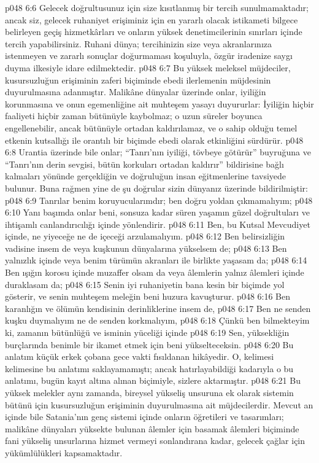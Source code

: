 \vs p048 6:6 Gelecek doğrultusunuz için size kısıtlanmış bir tercih sunulmamaktadır; ancak siz, gelecek ruhaniyet erişiminiz için en yararlı olacak istikameti bilgece belirleyen geçiş hizmetkârları ve onların yüksek denetimcilerinin sınırları içinde tercih yapabilirsiniz. Ruhani dünya; tercihinizin size veya akranlarınıza istenmeyen ve zararlı sonuçlar doğurmaması koşuluyla, özgür iradenize saygı duyma ilkesiyle idare edilmektedir.
\vs p048 6:7 Bu yüksek meleksel müjdeciler, kusursuzluğun erişiminin zaferi biçiminde ebedi ilerlemenin müjdesinin duyurulmasına adanmıştır. Malikâne dünyalar üzerinde onlar, iyiliğin korunmasına ve onun egemenliğine ait muhteşem yasayı duyururlar: İyiliğin hiçbir faaliyeti hiçbir zaman bütünüyle kaybolmaz; o uzun süreler boyunca engellenebilir, ancak bütünüyle ortadan kaldırılamaz, ve o sahip olduğu temel etkenin kutsallığı ile orantılı bir biçimde ebedi olarak etkinliğini sürdürür.
\vs p048 6:8 Urantia üzerinde bile onlar; “Tanrı’nın iyiliği, tövbeye götürür” buyruğuna ve “Tanrı’nın derin sevgisi, bütün korkuları ortadan kaldırır” bildirisine bağlı kalmaları yönünde gerçekliğin ve doğruluğun insan eğitmenlerine tavsiyede bulunur. Buna rağmen yine de şu doğrular sizin dünyanız üzerinde bildirilmiştir:
\vs p048 6:9 Tanrılar benim koruyucularımdır; ben doğru yoldan çıkmamalıyım;
\vs p048 6:10 Yanı başımda onlar beni, sonsuza kadar süren yaşamın güzel doğrultuları ve ihtişamlı canlandırıcılığı içinde yönlendirir.
\vs p048 6:11 Ben, bu Kutsal Mevcudiyet içinde, ne yiyeceğe ne de içeceği arzulamalıyım.
\vs p048 6:12 Ben belirsizliğin vadisine insem de veya kuşkunun dünyalarına yükselsem de;
\vs p048 6:13 Ben yalnızlık içinde veya benim türümün akranları ile birlikte yaşasam da;
\vs p048 6:14 Ben ışığın korosu içinde muzaffer olsam da veya âlemlerin yalnız âlemleri içinde duraklasam da;
\vs p048 6:15 Senin iyi ruhaniyetin bana kesin bir biçimde yol gösterir, ve senin muhteşem meleğin beni huzura kavuşturur.
\vs p048 6:16 Ben karanlığın ve ölümün kendisinin derinliklerine insem de,
\vs p048 6:17 Ben ne senden kuşku duymalıyım ne de senden korkmalıyım,
\vs p048 6:18 Çünkü ben bilmekteyim ki, zamanın bütünlüğü ve isminin yüceliği içinde
\vs p048 6:19 Sen, yüksekliğin burçlarında benimle bir ikamet etmek için beni yükselteceksin.
\vs p048 6:20 Bu anlatım küçük erkek çobana gece vakti fısıldanan hikâyedir. O, kelimesi kelimesine bu anlatımı saklayamamıştı; ancak hatırlayabildiği kadarıyla o bu anlatımı, bugün kayıt altına alınan biçimiyle, sizlere aktarmıştır.
\vs p048 6:21 Bu yüksek melekler aynı zamanda, bireysel yükseliş unsuruna ek olarak sistemin bütünü için kusursuzluğun erişiminin duyurulmasına ait müjdecilerdir. Mevcut an içinde bile Satania’nın genç sistemi içinde onların öğretileri ve tasarımları; malikâne dünyaları yüksekte bulunan âlemler için basamak âlemleri biçiminde fani yükseliş unsurlarına hizmet vermeyi sonlandırana kadar, gelecek çağlar için yükümlülükleri kapsamaktadır.
